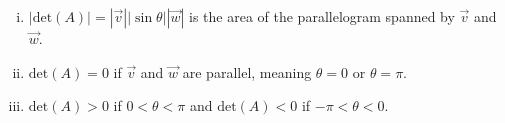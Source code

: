 \documentclass[a4paper,11pt]{article}
\begin{document}
\begin{outline}
    \begin{enumerate}[i.]
      \item 
        \(|\text{det}(A)|=|\vec{v}||\sin{\theta}||\vec{w}|\) is the area of the parallelogram spanned by
        \(\vec{v}\) and \(\vec{w}\).
      \item 
        \(\text{det}(A) = 0\) if \(\vec{v}\) and \(\vec{w}\) are parallel, meaning \(\theta = 0\) or
        \(\theta = \pi\).
      \item
        \(\text{det}(A) > 0\) if \(0 < \theta < \pi\) and \(\text{det}(A) < 0\) if \(-\pi < \theta < 0\).
    \end{enumerate}
\end{outline}
      
\end{document}
